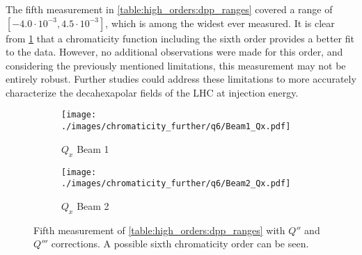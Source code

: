\subsubsection{}

The fifth measurement in \cref{table:high_orders:dpp_ranges} covered a range of $[-4.0 \cdot
10^{-3}, 4.5 \cdot 10^{-3}]$, which is among the widest ever measured. It is clear from
\cref{fig:high_orders:chroma_after_correction_full_range} that a chromaticity function including the
sixth order provides a better fit to the data. However, no additional observations were made for
this order, and considering the previously mentioned limitations, this measurement may not be
entirely robust. Further studies could address these limitations to more accurately characterize the
decahexapolar fields of the LHC at injection energy.

\begin{figure}[!htb]
    \begin{subfigure}{0.49\textwidth}
        \centering
        \texttt{[image: ./images/chromaticity\_further/q6/Beam1\_Qx.pdf]}
        \caption{$Q_x$ Beam 1}
    \end{subfigure}
    \hfill
    \begin{subfigure}{0.49\textwidth}
        \centering
        \texttt{[image: ./images/chromaticity\_further/q6/Beam2\_Qx.pdf]}
        \caption{$Q_x$ Beam 2}
    \end{subfigure}
    \caption{Fifth measurement of \cref{table:high_orders:dpp_ranges} with $Q''$ and $Q'''$
    corrections. A possible sixth chromaticity order can be seen.}
    \label{fig:high_orders:chroma_after_correction_full_range}
\end{figure}

